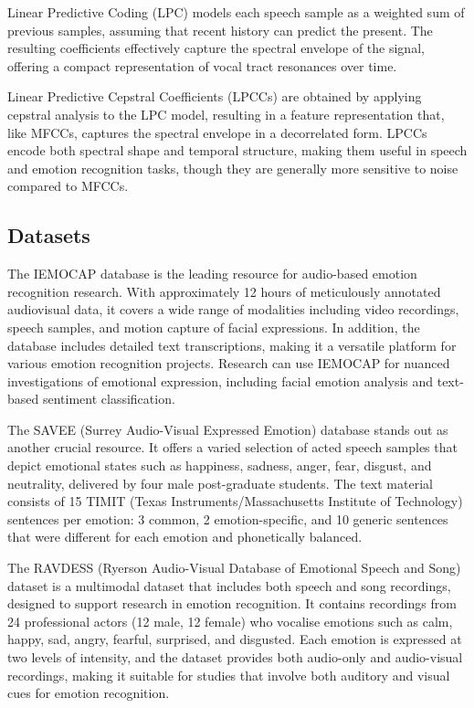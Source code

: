 Linear Predictive Coding (LPC) \cite{OShaughnessy1988-ws} models each speech sample as a weighted sum of previous samples, assuming that recent history can predict the present. The resulting coefficients effectively capture the spectral envelope of the signal, offering a compact representation of vocal tract resonances over time.

Linear Predictive Cepstral Coefficients (LPCCs) \cite{6895780} are obtained by applying cepstral analysis to the LPC model, resulting in a feature representation that, like MFCCs, captures the spectral envelope in a decorrelated form. LPCCs encode both spectral shape and temporal structure, making them useful in speech and emotion recognition tasks, though they are generally more sensitive to noise compared to MFCCs.

\subsection{Datasets}

The IEMOCAP database \cite{Busso2008-qj} is the leading resource for audio-based emotion recognition research. With approximately 12 hours of meticulously annotated audiovisual data, it covers a wide range of modalities including video recordings, speech samples, and motion capture of facial expressions. In addition, the database includes detailed text transcriptions, making it a versatile platform for various emotion recognition projects. Research can use IEMOCAP for nuanced investigations of emotional expression, including facial emotion analysis and text-based sentiment classification.

The SAVEE (Surrey Audio-Visual Expressed Emotion) database \cite{HaqJackson_AVSP09} stands out as another crucial resource. It offers a varied selection of acted speech samples that depict emotional states such as happiness, sadness, anger, fear, disgust, and neutrality, delivered by four male post-graduate students. The text material consists of 15 TIMIT (Texas Instruments/Massachusetts Institute of Technology) sentences per emotion: 3 common, 2 emotion-specific, and 10 generic sentences that were different for each emotion and phonetically balanced.

The RAVDESS (Ryerson Audio-Visual Database of Emotional Speech and Song) dataset \cite{Livingstone2018-li} is a multimodal dataset that includes both speech and song recordings, designed to support research in emotion recognition. It contains recordings from 24 professional actors (12 male, 12 female) who vocalise emotions such as calm, happy, sad, angry, fearful, surprised, and disgusted. Each emotion is expressed at two levels of intensity, and the dataset provides both audio-only and audio-visual recordings, making it suitable for studies that involve both auditory and visual cues for emotion recognition.

